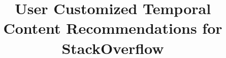 \documentclass{sig-alternate-05-2015}
\begin{document}






%


\title{User Customized Temporal Content Recommendations for StackOverflow}
%
%
%
%
%
\end{document}
